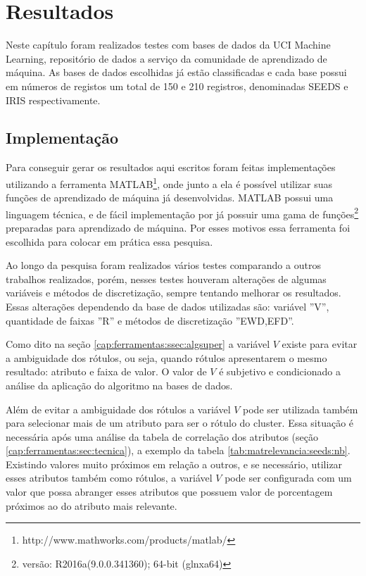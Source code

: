 \chapter{Resultados}\label{cap:resultados}

Neste capítulo foram realizados testes com bases de dados da UCI Machine Learning, repositório de dados a serviço da comunidade de aprendizado de máquina. As bases de dados escolhidas já estão classificadas e cada base possui em números de registos um total de 150 e 210 registros, denominadas SEEDS e IRIS respectivamente.

\section{Implementação}

Para conseguir gerar os resultados aqui escritos foram feitas implementações utilizando a ferramenta MATLAB\footnote{http://www.mathworks.com/products/matlab/}, onde junto  a ela é possível utilizar suas funções de aprendizado de máquina já desenvolvidas. MATLAB possui uma linguagem técnica, e de fácil implementação por já possuir uma gama de funções\footnote{versão: R2016a(9.0.0.341360); 64-bit (glnxa64)} preparadas para aprendizado de máquina. Por esses motivos essa ferramenta foi escolhida para colocar em prática essa pesquisa.

Ao longo da pesquisa foram realizados vários testes comparando a outros trabalhos realizados, porém, nesses testes houveram alterações de algumas variáveis e métodos de discretização, sempre tentando melhorar os resultados. Essas alterações dependendo da base de dados utilizadas são: variável ''V'', quantidade de faixas ''R'' e métodos de discretização ''EWD,EFD''. 

Como dito na seção \ref{cap:ferramentas:ssec:algsuper} a variável ${V}$ existe para evitar a ambiguidade dos rótulos, ou seja, quando rótulos apresentarem o mesmo resultado: atributo e faixa de valor. O valor de ${V}$ é subjetivo e condicionado a análise da aplicação do algoritmo na bases de dados.

Além de evitar a ambiguidade dos rótulos a variável ${V}$ pode ser utilizada também para selecionar mais de um atributo para ser o rótulo do cluster. Essa situação é necessária após uma análise da tabela de correlação dos atributos (seção \ref{cap:ferramentas:sec:tecnica}), a exemplo da tabela \ref{tab:matrelevancia:seeds:nb}. Existindo valores muito próximos em relação a outros, e se necessário, utilizar esses atributos também como rótulos, a variável ${V}$ pode ser configurada com um valor que possa abranger esses atributos que possuem valor de porcentagem próximos ao do atributo mais relevante. 

